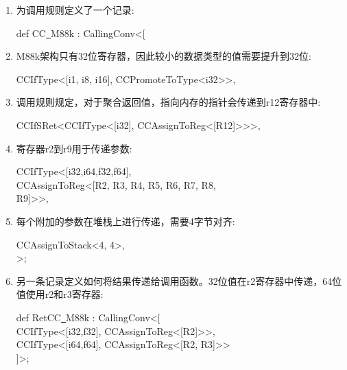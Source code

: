 \begin{enumerate}
\item 为调用规则定义了一个记录:
\begin{tcolorbox}[colback=white,colframe=black]
def CC\underline{~}M88k : CallingConv<[
\end{tcolorbox}

\item M88k架构只有32位寄存器，因此较小的数据类型的值需要提升到32位:
\begin{tcolorbox}[colback=white,colframe=black]
\hspace*{0.5cm}CCIfType<[i1, i8, i16], CCPromoteToType<i32>>,
\end{tcolorbox}

\item 调用规则规定，对于聚合返回值，指向内存的指针会传递到r12寄存器中:
\begin{tcolorbox}[colback=white,colframe=black]
\hspace*{0.5cm}CCIfSRet<CCIfType<[i32], CCAssignToReg<[R12]>>>,
\end{tcolorbox}

\item 寄存器r2到r9用于传递参数:
\begin{tcolorbox}[colback=white,colframe=black]
\hspace*{0.5cm}CCIfType<[i32,i64,f32,f64], \\
\hspace*{1cm}CCAssignToReg<[R2, R3, R4, R5, R6, R7, R8, \\
\hspace*{1.5cm}R9]>>, 
\end{tcolorbox}

\item 每个附加的参数在堆栈上进行传递，需要4字节对齐:
\begin{tcolorbox}[colback=white,colframe=black]
\hspace*{0.5cm}CCAssignToStack<4, 4>, \\
>;
\end{tcolorbox}

\item 另一条记录定义如何将结果传递给调用函数。32位值在r2寄存器中传递，64位值使用r2和r3寄存器:
\begin{tcolorbox}[colback=white,colframe=black]
def RetCC\underline{~}M88k : CallingConv<[ \\
\hspace*{0.5cm}CCIfType<[i32,f32], CCAssignToReg<[R2]>>, \\
\hspace*{0.5cm}CCIfType<[i64,f64], CCAssignToReg<[R2, R3]>> \\
]>;
\end{tcolorbox}


\end{enumerate}
